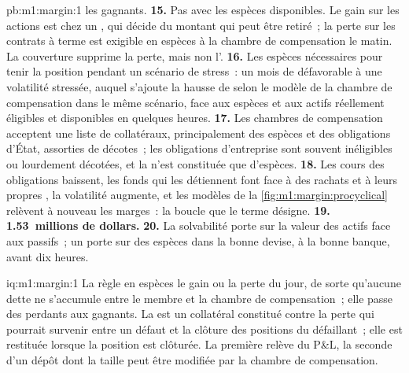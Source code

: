 \begin{solution}{pb:m1:margin:1}
les gagnants.
\textbf{15.} Pas avec les espèces disponibles. Le gain sur les actions est chez un , qui
décide du montant qui peut être retiré~; la perte sur les contrats à terme est exigible en espèces à la
chambre de compensation le matin. La couverture supprime la perte, mais non l'.
\textbf{16.} Les espèces nécessaires pour tenir la position pendant un scénario de stress~: un mois
de  défavorable à une volatilité stressée, auquel s'ajoute la hausse de
 selon le modèle de la chambre de compensation dans le même scénario,
face aux espèces et aux actifs réellement éligibles et disponibles en quelques heures.
\textbf{17.} Les chambres de compensation acceptent une liste de collatéraux, principalement des espèces et
des obligations d'État, assorties de décotes~; les obligations d'entreprise sont souvent inéligibles ou
lourdement décotées, et la  n'est constituée que d'espèces.
\textbf{18.} Les cours des obligations baissent, les fonds qui les détiennent font face à des rachats et à leurs
propres , la volatilité augmente, et les modèles de
la \cref{fig:m1:margin:procyclical} relèvent à nouveau les marges~: la boucle que le
terme  désigne.
\textbf{19.} \textbf{1.53~millions de dollars.}
\textbf{20.} La solvabilité porte sur la valeur des actifs face aux passifs~;
un  porte sur des espèces dans la bonne devise, à la bonne banque, avant dix
heures.
\end{solution}

\begin{solution}{iq:m1:margin:1}
La  règle en espèces le gain ou la perte du jour, de sorte qu'aucune dette
ne s'accumule entre le membre et la chambre de compensation~; elle passe des perdants aux
gagnants. La  est un collatéral constitué contre la perte qui pourrait survenir
entre un défaut et la clôture des positions du défaillant~; elle est restituée lorsque
la position est clôturée. La première relève du P\&L, la seconde d'un dépôt dont la
taille peut être modifiée par la chambre de compensation.
\end{solution}

